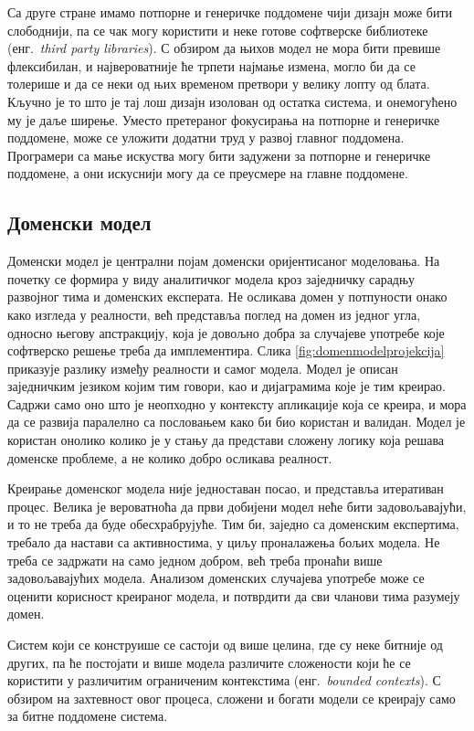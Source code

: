 \documentclass[12pt,oneside]{memoir}
\begin{document}
Са друге стране имамо потпорне и генеричке поддомене чији дизајн може бити слободнији, па се чак могу користити и неке готове софтверске библиотеке (енг.~\textit{third party libraries}). С обзиром да њихов модел не мора бити превише флексибилан, и највероватније ће трпети најмање измена, могло би да се толерише и да се неки од њих временом претвори у велику лопту од блата. Кључно је то што је тај лош дизајн изолован од остатка система, и онемогућено му је даље ширење. Уместо претераног фокусирања на потпорне и генеричке поддомене, може се уложити додатни труд у развој главног поддомена. Програмери са мање искуства могу бити задужени за потпорне и генеричке поддомене, а они искуснији могу да се преусмере на главне поддомене.

\subsection{Доменски модел}
Доменски модел је централни појам доменски оријентисаног моделовања. На почетку се формира у виду аналитичког модела кроз заједничку сарадњу развојног тима и доменских експерата. Не осликава домен у потпуности онако како изгледа у реалности, већ представља поглед на домен из једног угла, односно његову апстракцију, која је довољно добра за случајеве употребе које софтверско решење треба да имплементира. Слика \ref{fig:domenmodelprojekcija} приказује разлику између реалности и самог модела. Модел је описан заједничким језиком којим тим говори, као и дијаграмима које је тим креирао. Садржи само оно што је неопходно у контексту апликације која се креира, и мора да се развија паралелно са пословањем како би био користан и валидан. Модел је користан онолико колико је у стању да представи сложену логику која решава доменске проблеме, а не колико добро осликава реалност.

Креирање доменског модела није једноставан посао, и представља итеративан процес. Велика је вероватноћа да први добијени модел неће бити задовољавајући, и то не треба да буде обесхрабрујуће. Тим би, заједно са доменским експертима, требало да настави са активностима, у циљу проналажења бољих модела. Не треба се задржати на само једном добром, већ треба пронаћи више задовољавајућих модела. Анализом доменских случајева употребе може се оценити корисност креираног модела, и потврдити да сви чланови тима разумеју домен.

Систем који се конструише се састоји од више целина, где су неке битније од других, па ће постојати и више модела различите сложености који ће се користити у различитим ограниченим контекстима (енг.~\textit{bounded contexts}). С обзиром на захтевност овог процеса, сложени и богати модели се креирају само за битне поддомене система. 
\end{document}
